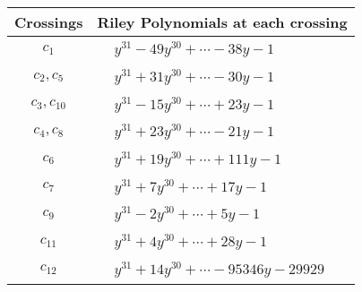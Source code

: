 \documentclass[1p]{elsarticle_modified}
\theoremstyle{definition}
\begin{document}
\begin{tabular}{m{50pt}|m{274pt}}
Crossings & \hspace{64pt}Riley Polynomials at each crossing \\
\hline $$\begin{aligned}c_{1}\end{aligned}$$&$\begin{aligned}
&y^{31}-49 y^{30}+\cdots-38 y-1
\end{aligned}$\\
\hline $$\begin{aligned}c_{2},c_{5}\end{aligned}$$&$\begin{aligned}
&y^{31}+31 y^{30}+\cdots-30 y-1
\end{aligned}$\\
\hline $$\begin{aligned}c_{3},c_{10}\end{aligned}$$&$\begin{aligned}
&y^{31}-15 y^{30}+\cdots+23 y-1
\end{aligned}$\\
\hline $$\begin{aligned}c_{4},c_{8}\end{aligned}$$&$\begin{aligned}
&y^{31}+23 y^{30}+\cdots-21 y-1
\end{aligned}$\\
\hline $$\begin{aligned}c_{6}\end{aligned}$$&$\begin{aligned}
&y^{31}+19 y^{30}+\cdots+111 y-1
\end{aligned}$\\
\hline $$\begin{aligned}c_{7}\end{aligned}$$&$\begin{aligned}
&y^{31}+7 y^{30}+\cdots+17 y-1
\end{aligned}$\\
\hline $$\begin{aligned}c_{9}\end{aligned}$$&$\begin{aligned}
&y^{31}-2 y^{30}+\cdots+5 y-1
\end{aligned}$\\
\hline $$\begin{aligned}c_{11}\end{aligned}$$&$\begin{aligned}
&y^{31}+4 y^{30}+\cdots+28 y-1
\end{aligned}$\\
\hline $$\begin{aligned}c_{12}\end{aligned}$$&$\begin{aligned}
&y^{31}+14 y^{30}+\cdots-95346 y-29929
\end{aligned}$\\
\hline
\end{tabular}\\~\\
\end{document}
